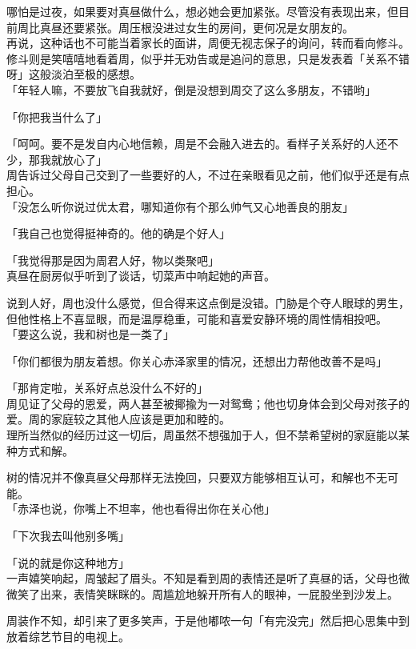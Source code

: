 哪怕是过夜，如果要对真昼做什么，想必她会更加紧张。尽管没有表现出来，但目前周比真昼还要紧张。周压根没进过女生的房间，更何况是女朋友的。\\

再说，这种话也不可能当着家长的面讲，周便无视志保子的询问，转而看向修斗。修斗则是笑嘻嘻地看着周，似乎并无劝告或是追问的意思，只是发表着「关系不错呀」这般淡泊至极的感想。\\

「年轻人嘛，不要放飞自我就好，倒是没想到周交了这么多朋友，不错哟」

「你把我当什么了」

「呵呵。要不是发自内心地信赖，周是不会融入进去的。看样子关系好的人还不少，那我就放心了」\\

周告诉过父母自己交到了一些要好的人，不过在亲眼看见之前，他们似乎还是有点担心。\\

「没怎么听你说过优太君，哪知道你有个那么帅气又心地善良的朋友」

「我自己也觉得挺神奇的。他的确是个好人」

「我觉得那是因为周君人好，物以类聚吧」\\

真昼在厨房似乎听到了谈话，切菜声中响起她的声音。

说到人好，周也没什么感觉，但合得来这点倒是没错。门胁是个夺人眼球的男生，但他性格上不喜显眼，而是温厚稳重，可能和喜爱安静环境的周性情相投吧。\\

「要这么说，我和树也是一类了」

「你们都很为朋友着想。你关心赤泽家里的情况，还想出力帮他改善不是吗」

「那肯定啦，关系好点总没什么不好的」\\

周见证了父母的恩爱，两人甚至被揶揄为一对鸳鸯；他也切身体会到父母对孩子的爱。周的家庭较之其他人应该是更加和睦的。\\

理所当然似的经历过这一切后，周虽然不想强加于人，但不禁希望树的家庭能以某种方式和解。

树的情况并不像真昼父母那样无法挽回，只要双方能够相互认可，和解也不无可能。\\

「赤泽也说，你嘴上不坦率，他也看得出你在关心他」

「下次我去叫他别多嘴」

「说的就是你这种地方」\\

一声嬉笑响起，周皱起了眉头。不知是看到周的表情还是听了真昼的话，父母也微微笑了出来，表情笑眯眯的。周尴尬地躲开所有人的眼神，一屁股坐到沙发上。

周装作不知，却引来了更多笑声，于是他嘟哝一句「有完没完」然后把心思集中到放着综艺节目的电视上。
